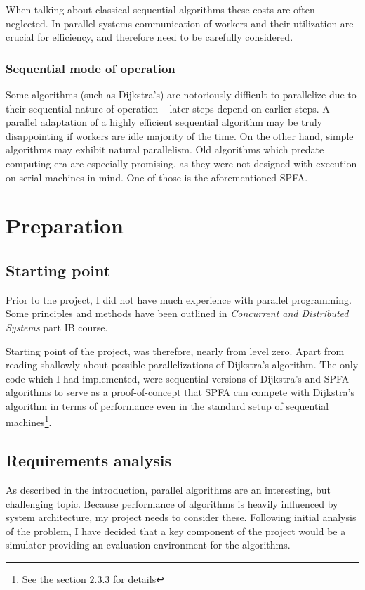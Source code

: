 \documentclass[12pt,a4paper,twoside,openright]{report}
\begin{document}
When talking about classical sequential algorithms these costs are often neglected. In parallel systems communication of workers and their utilization are crucial for efficiency, and therefore need to be carefully considered.

\subsection{Sequential mode of operation}
Some algorithms (such as Dijkstra's) are notoriously difficult to parallelize due to their sequential nature of operation -- later steps depend on earlier steps. A parallel adaptation of a highly efficient sequential algorithm may be truly disappointing if workers are idle majority of the time. On the other hand, simple algorithms may exhibit natural parallelism. Old algorithms which predate computing era are especially promising, as they were not designed with execution on serial machines in mind. One of those is the aforementioned SPFA.

\chapter{Preparation}
\section{Starting point}
Prior to the project, I did not have much experience with parallel programming. Some principles and methods have been outlined in \textit{Concurrent and Distributed Systems} part IB course.

Starting point of the project, was therefore, nearly from level zero. Apart from reading shallowly about possible parallelizations of Dijkstra's algorithm. The only code which I had implemented, were sequential versions of Dijkstra's and SPFA algorithms to serve as a proof-of-concept that SPFA can compete with Dijkstra's algorithm in terms of performance even in the standard setup of sequential machines\footnote{See the section $2.3.3$ for details}.

\section{Requirements analysis}
As described in the introduction, parallel algorithms are an interesting, but challenging topic. Because performance of algorithms is heavily influenced by system architecture, my project needs to consider these. Following initial analysis of the problem, I have decided that a key component of the project would be a simulator providing an evaluation environment for the algorithms.
\end{document}
